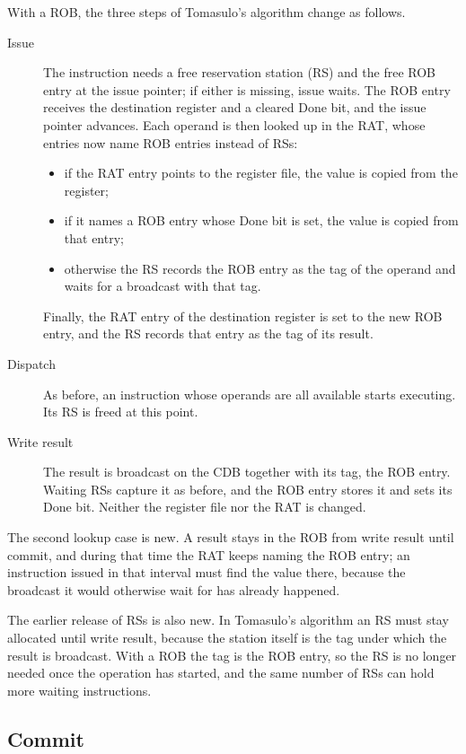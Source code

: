 \documentclass[../main.tex]{subfiles}
\begin{document}
With a ROB, the three steps of Tomasulo's algorithm change as
follows.
\begin{description}
  \item[Issue] The instruction needs a free reservation station (RS) and the
    free ROB entry at the issue pointer; if either is missing, issue waits.
    The ROB entry receives the destination register and a cleared Done bit,
    and the issue pointer advances.  Each operand is then looked up in the
    RAT, whose entries now name ROB entries instead of RSs:
    \begin{itemize}
      \item if the RAT entry points to the register file, the value is
        copied from the register;
      \item if it names a ROB entry whose Done bit is set, the value is copied
        from that entry;
      \item otherwise the RS records the ROB entry as the tag of the operand
        and waits for a broadcast with that tag.
    \end{itemize}
    Finally, the RAT entry of the destination register is set to the new ROB
    entry, and the RS records that entry as the tag of its result.
  \item[Dispatch] As before, an instruction whose operands are all available
    starts executing.  Its RS is freed at this point.
  \item[Write result] The result is broadcast on the CDB together with its
    tag, the ROB entry.  Waiting RSs capture it as before, and the ROB
    entry stores it and sets its Done bit.  Neither the register file nor the
    RAT is changed.
\end{description}

The second lookup case is new.  A result stays in the ROB from write result
until commit, and during that time the RAT keeps naming the ROB entry; an
instruction issued in that interval must find the value there, because the
broadcast it would otherwise wait for has already happened.

The earlier release of RSs is also new.  In
Tomasulo's algorithm an RS must stay allocated until write result, because
the station itself is the tag under which the result is broadcast.  With a ROB
the tag is the ROB entry, so the RS is no longer needed once the
operation has started, and the same number of RSs can hold more waiting
instructions.

\subsection{Commit}
\end{document}
